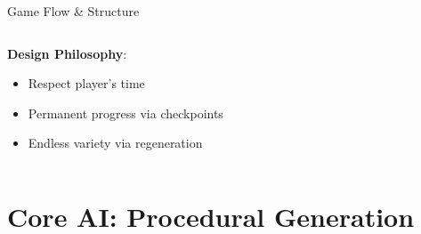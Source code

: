 \documentclass{beamer}
\begin{document}
\begin{frame}{Game Flow \& Structure}
\begin{columns}[T]
\begin{column}{0.48\textwidth}
            \vspace{0.2cm}
            \textbf{Design Philosophy}:
            \begin{itemize}
                \item Respect player's time
                \item Permanent progress via checkpoints
                \item Endless variety via regeneration
            \end{itemize}
        \end{column}
    \end{columns}
\end{frame}

\section{Core AI: Procedural Generation}
\end{document}
